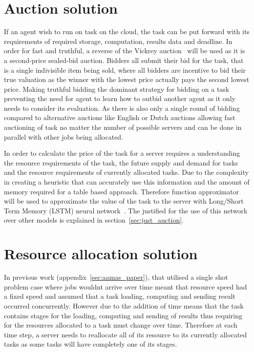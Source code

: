 \documentclass[sotoncolour]{uosproject}     %
\begin{document}
\section{Auction solution}\label{sec:auction_solution}
If an agent wish to run on task on the cloud, the task can be put forward with its requirements of required storage,
computation, results data and deadline. In order for fast and truthful, a reverse of the Vickrey auction~\cite{vickrey}
will be used as it is a second-price sealed-bid auction. Bidders all submit their bid for the task,
that is a single indivisible item being sold, where all bidders are incentive to bid their true valuation as the winner
with the lowest price actually pays the second lowest price. Making truthful bidding the dominant strategy for bidding
on a task preventing the need for agent to learn how to outbid another agent as it only needs to consider its
evaluation. As there is also only a single round of bidding compared to alternative auctions like English or Dutch
auctions allowing fast auctioning of task no matter the number of possible servers and can be done in parallel with
other jobs being allocated. %

In order to calculate the price of the task for a server requires a understanding the resource requirements of the task,
the future supply and demand for tasks and the resource requirements of currently allocated tasks. Due to the complexity
in creating a heuristic that can accurately use this information and the amount of memory required for a table based
approach. Therefore function approximator will be used to approximate the value of the task to the server with
Long/Short Term Memory (LSTM) neural network~\cite{LSTM}. The justified for the use of this network over other models
is explained in section~\ref{sec:just_auction}.

\section{Resource allocation solution}\label{sec:resource_allocation}
In previous work (appendix~\ref{sec:aamas_paper}), that utilised a single shot problem case where jobs wouldnt arrive
over time meant that resource speed had a fixed speed and assumed that a task loading, computing and sending result
occurred concurrently. However due to the addition of time means that the task contains stages for the loading,
computing and sending of results thus requiring for the resources allocated to a task must change over time.
Therefore at each time step, a server needs to reallocate all of its resource to its currently allocated tasks as
some tasks will have completely one of its stages.
\end{document}
